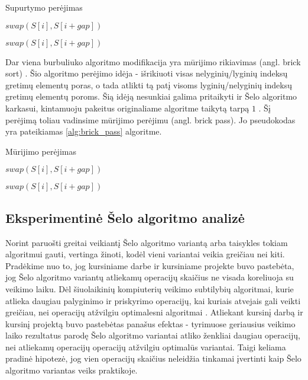 \documentclass{VUMIFInfBakalaurinis}
\begin{document}
\begin{algorithm}[H]
  \caption{Supurtymo perėjimas}\label{alg:shake_pass}
  \begin{algorithmic}[1]
        \State $swap(S[i], S[i+gap])$
      \EndIf
    \EndFor

        \State $swap(S[i], S[i+gap])$
      \EndIf
    \EndFor
  \end{algorithmic}
\end{algorithm}

Dar viena burbuliuko algoritmo modifikacija yra mūrijimo rikiavimas (angl. brick sort) \cite{habermann1972parallel}.
Šio algoritmo perėjimo idėja - išrikiuoti visas nelyginių/lyginių indeksų gretimų elementų poras,
o tada atlikti tą patį visoms lyginių/nelyginių indeksų gretimų elementų poroms.
Šią idėją nesunkiai galima pritaikyti ir Šelo algoritmo karkasui, kintamuoju pakeitus originaliame algoritme taikytą tarpą $1$ \cite{lemke1994performance}.
Šį perėjimą toliau vadinsime mūrijimo perėjimu (angl. brick pass).
Jo pseudokodas yra pateikiamas \ref{alg:brick_pass} algoritme.

\begin{algorithm}[H]
  \caption{Mūrijimo perėjimas}\label{alg:brick_pass}
  \begin{algorithmic}[1]
        \State $swap(S[i], S[i+gap])$
      \EndIf
    \EndFor

        \State $swap(S[i], S[i+gap])$
      \EndIf
    \EndFor
  \end{algorithmic}
\end{algorithm}


\subsection{Eksperimentinė Šelo algoritmo analizė}

Norint paruošti greitai veikiantį Šelo algoritmo variantą arba taisykles tokiam algoritmui gauti, vertinga žinoti, kodėl vieni variantai veikia greičiau nei kiti.
Pradėkime nuo to, jog kursiniame darbe ir kursiniame projekte buvo pastebėta, jog Šelo algoritmo variantų atliekamų operacijų skaičius ne visada koreliuoja su veikimo laiku.
Dėl šiuolaikinių kompiuterių veikimo subtilybių algoritmai, kurie atlieka daugiau palyginimo ir priskyrimo operacijų,
kai kuriais atvejais gali veikti greičiau, nei operacijų atžvilgiu optimalesni algoritmai \cite{peters2021pattern}.
Atliekant kursinį darbą ir kursinį projektą buvo pastebėtas panašus efektas - 
tyrimuose geriausius veikimo laiko rezultatus parodę Šelo algoritmo variantai atliko ženkliai daugiau operacijų, nei atliekamų operacijų operacijų atžvilgiu optimalūs variantai.
Taigi keliama pradinė hipotezė, jog vien operacijų skaičius neleidžia tinkamai įvertinti kaip Šelo algoritmo variantas veiks praktikoje.
\end{document}
